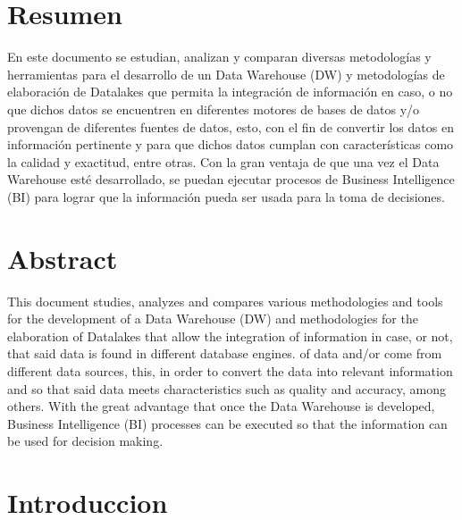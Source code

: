 \documentclass[twoside,twocolumn]{article}
\begin{document}
\maketitle


\section{Resumen}
En este documento se estudian, analizan y comparan diversas metodologías y herramientas para el desarrollo de un Data Warehouse (DW) y metodologías de elaboración de Datalakes que permita la integración de información en caso, o no que dichos datos se encuentren en diferentes motores de bases de datos y/o provengan de diferentes fuentes de datos, esto, con el fin de convertir los datos en información pertinente y para que dichos datos cumplan con características como la calidad y exactitud, entre otras. Con la gran ventaja de que una vez el Data Warehouse esté desarrollado, se puedan ejecutar procesos de Business Intelligence (BI) para lograr que la información pueda ser usada para la toma de decisiones. 


\section{Abstract}

This document studies, analyzes and compares various methodologies and tools for the development of a Data Warehouse (DW) and methodologies for the elaboration of Datalakes that allow the integration of information in case, or not, that said data is found in different database engines. of data and/or come from different data sources, this, in order to convert the data into relevant information and so that said data meets characteristics such as quality and accuracy, among others. With the great advantage that once the Data Warehouse is developed, Business Intelligence (BI) processes can be executed so that the information can be used for decision making. 



\section{Introduccion}
\end{document}
